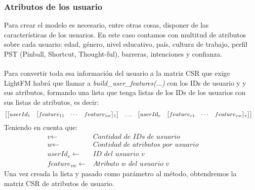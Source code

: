 \subsubsection{Atributos de los usuario}
Para crear el modelo es necesario, entre otras cosas, disponer de las características de los usuarios. En este caso contamos con multitud de atributos sobre cada usuario: edad, género, nivel educativo, país, cultura de trabajo, perfil PST (Pinball, Shortcut, Thought-ful), barreras, intenciones y confianza.
\\ \\
Para convertir toda esa información del usuario a la matriz CSR que exige LightFM habrá que llamar a \textit{build\_user\_features($\ldots$)} con los IDs de usuario y y sus atributos, formando una lista que tenga listas de los IDs de los usuarios con sus listas de atributos, es decir:
\begin{align*}
    \begin{bmatrix}
        \begin{bmatrix} 
            userId$$_{1}$$ & \begin{bmatrix} feature$$_{11}$$ &\cdots & feature$$_{1w}$$ \end{bmatrix}$$_1$$
        \end{bmatrix}
        &
        \ldots
        &
        \begin{bmatrix} 
            userId$$_{v}$$ & \begin{bmatrix} feature$$_{v1}$$ &\cdots & feature$$_{vw}$$ \end{bmatrix}$$_v$$
        \end{bmatrix}
    \end{bmatrix}
\end{align*}
Teniendo en cuenta que:
\begin{align*}
    \textit{v}\gets & \textit{Cantidad de IDs de usuario }
    &&\\
    \textit{w} \gets & \textit{Contidad de atributos por usuario}
    &&\\
    \textit{userId$_{v}$} \gets & \textit{ID del usuario v}
    &&\\
    \textit{feature$_{vw}$} \gets & \textit{Atributo w del usuario v}
\end{align*}
%
Una vez creada la lista y pasado como parámetro al método, obtendremos la matriz CSR de atributos de usuario.

